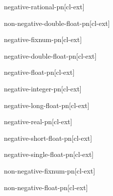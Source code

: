\documentclass[10pt,english]{book}
\begin{document}
\begin{function}{negative-rational-p}{n}[cl-ext]
  
\end{function}

\begin{function}{non-negative-double-float-p}{n}[cl-ext]
  
\end{function}

\begin{function}{negative-fixnum-p}{n}[cl-ext]
  
\end{function}

\begin{function}{negative-double-float-p}{n}[cl-ext]
  
\end{function}

\begin{function}{negative-float-p}{n}[cl-ext]
  
\end{function}

\begin{function}{negative-integer-p}{n}[cl-ext]
  
\end{function}

\begin{function}{negative-long-float-p}{n}[cl-ext]
  
\end{function}

\begin{function}{negative-real-p}{n}[cl-ext]
  
\end{function}

\begin{function}{negative-short-float-p}{n}[cl-ext]
  
\end{function}

\begin{function}{negative-single-float-p}{n}[cl-ext]
  
\end{function}

\begin{function}{non-negative-fixnum-p}{n}[cl-ext]
  
\end{function}

\begin{function}{non-negative-float-p}{n}[cl-ext]
  
\end{function}
\end{document}
